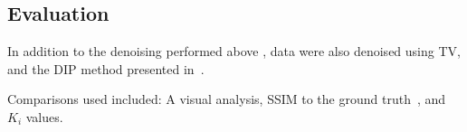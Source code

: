     \vspace{-0.5cm}
    
    \subsection{Evaluation} \label{sec:evaluation}
        In addition to the denoising performed above%
        , data were also denoised using \gls{TV}, and the \gls{DIP} method presented in~\cite{Gong2019PETPrior}.
        
        Comparisons used included: A visual analysis, \gls{SSIM} to the ground truth~\cite{Wang2009MeanMeasures}, and $K_i$ values.%

\vspace{-0.5cm}

